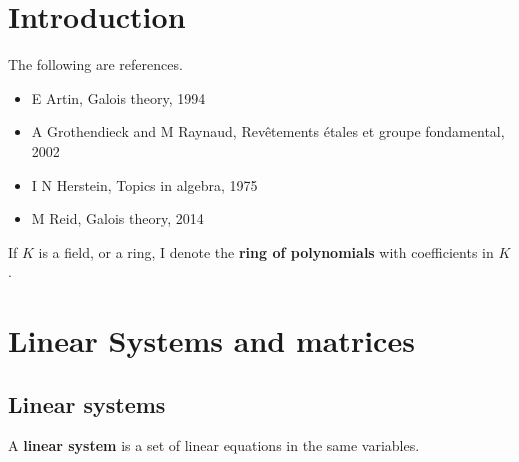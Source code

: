 \documentclass[../Year1/Year1.tex]{subfiles}
\begin{document}
%


\section{Introduction}


The following are references.
\begin{itemize}
\item E Artin, Galois theory, 1994
\item A Grothendieck and M Raynaud, Rev\^etements \'etales et groupe fondamental, 2002
\item I N Herstein, Topics in algebra, 1975
\item M Reid, Galois theory, 2014
\end{itemize}

\begin{notation*}
If $ K $ is a field, or a ring, I denote
the \textbf{ring of polynomials} with coefficients in $ K $.
\end{notation*}

\section{Linear Systems and matrices}
\subsection{Linear systems}
\begin{definition}
    A \textbf{linear system} is a set of linear equations in the same variables.
\end{definition}
\end{document}
